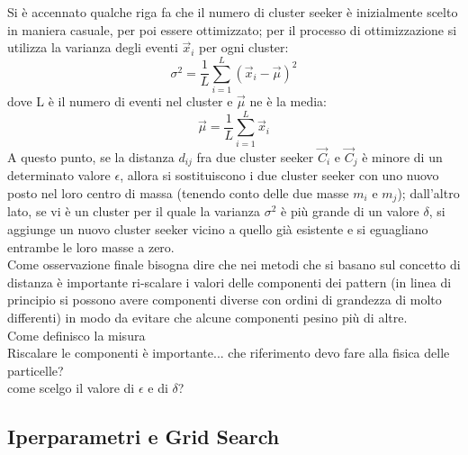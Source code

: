Si è accennato qualche riga fa che il numero di cluster seeker è inizialmente scelto in maniera casuale, per poi essere ottimizzato; per il processo di ottimizzazione si utilizza la varianza degli eventi $\vec{x}_i$ per ogni cluster:
\begin{equation}
\sigma^2 = \frac{1}{L}\sum_{i=1}^{L} (\vec{x}_i - \vec{\mu})^2
\end{equation}
dove L è il numero di eventi nel cluster e $\vec{\mu}$ ne è la media:
\begin{equation}
\vec{\mu} = \frac{1}{L}\sum_{i=1}^{L} \vec{x}_i
\end{equation}
A questo punto, se la distanza $d_{ij}$ fra due cluster seeker $\vec{C}_i$ e $\vec{C}_j$ è minore di un determinato valore $\epsilon$, allora si sostituiscono i due cluster seeker con uno nuovo posto nel loro centro di massa (tenendo conto delle due masse $m_i$ e $m_j$); dall'altro lato, se vi è un cluster per il quale la varianza $\sigma^2$ è più grande di un valore $\delta$, si aggiunge un nuovo cluster seeker vicino a quello già esistente e si eguagliano entrambe le loro masse a zero.\\
Come osservazione finale bisogna dire che nei metodi che si basano sul concetto di distanza è importante ri-scalare i valori delle componenti dei pattern (in linea di principio si possono avere componenti diverse con ordini di grandezza di molto differenti) in modo da evitare che alcune componenti pesino più di altre. \\ 

\color{red}
Come definisco la misura\\
Riscalare le componenti è importante... che riferimento devo fare alla fisica delle particelle? \\
come scelgo il valore di $\epsilon$ e di $\delta$?
\color{black}


\newpage


\subsection{Iperparametri e Grid Search}
\label{iperparametri e grid search}

